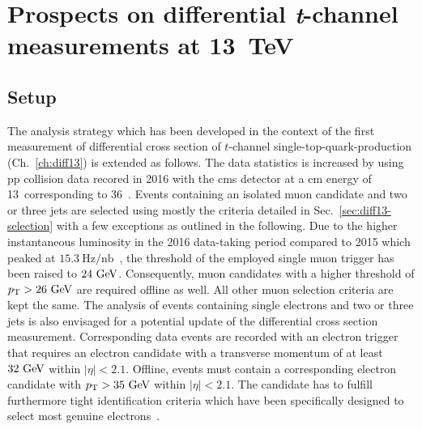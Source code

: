 \chapter{Prospects on differential \textsl{t}-channel measurements at 13~TeV}
\label{ch:prospects}



\section{Setup}

The analysis strategy which has been developed in the context of the first measurement of differential cross section of $t$-channel single-top-quark-production (Ch.~\ref{ch:diff13}) is extended as follows. The data statistics is increased by using \gls{pp} collision data recored in 2016 with the \gls{cms} detector at a \acrlong{cm} energy of 13~\TeV corresponding to 36~\invfb. Events containing an isolated muon candidate and two or three jets are selected using mostly the criteria detailed in Sec.~\ref{sec:diff13-selection} with a few exceptions as outlined in the following. Due to the higher instantaneous luminosity in the 2016 data-taking period compared to 2015 which peaked at $15.3~\mathrm{Hz}/\mathrm{nb}$~\cite{lumipublic}, the threshold of the employed single muon trigger has been raised to $24~\textrm{GeV}$. Consequently, muon candidates with a higher threshold of $p_\textrm{T}>26~\textrm{GeV}$ are required offline as well. All other muon selection criteria are kept the same. The analysis of events containing single electrons and two or three jets is also envisaged for a potential update of the differential cross section measurement. Corresponding data events are recorded with an electron trigger that requires an electron candidate with a transverse momentum of at least $32~\textrm{GeV}$ within $|\eta|<2.1$. Offline, events must contain a corresponding electron candidate with $p_\textrm{T}>35~\textrm{GeV}$ within $|\eta|<2.1$. The candidate has to fulfill furthermore tight identification criteria which have been specifically designed to select most genuine electrons~\cite{CMS-DP-2017-004}.

